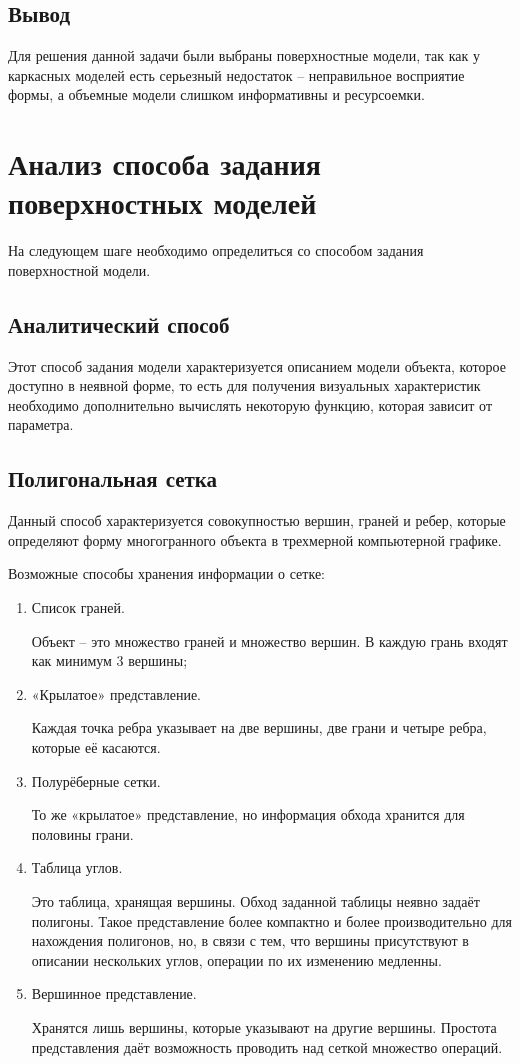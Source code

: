 \subsection*{Вывод}	
Для решения данной задачи были выбраны поверхностные модели, так как у каркасных моделей есть серьезный недостаток – неправильное восприятие формы, а объемные модели слишком информативны и ресурсоемки.

\section{Анализ способа задания поверхностных моделей}
На следующем шаге необходимо определиться со способом задания поверхностной модели.

\subsection{Аналитический способ}

 Этот способ задания модели характеризуется описанием модели объекта, которое доступно в неявной форме, то есть для получения визуальных характеристик необходимо дополнительно вычислять некоторую функцию, которая зависит от параметра.

\subsection{Полигональная сетка}

 Данный способ характеризуется совокупностью вершин, граней и ребер, которые определяют форму многогранного объекта в трехмерной компьютерной графике.

Возможные способы хранения информации о сетке:

\begin{enumerate}

\item Список граней. 

Объект – это множество граней и множество вершин. В каждую грань входят как минимум 3 вершины;
\item«Крылатое» представление. 

Каждая точка ребра указывает на две вершины, две грани и четыре ребра, которые её касаются.

\item Полурёберные сетки.

 То же «крылатое» представление, но информация обхода хранится для половины грани.
 
\item Таблица углов.

 Это таблица, хранящая вершины. Обход заданной таблицы неявно задаёт полигоны. Такое представление более компактно и более производительно для нахождения полигонов, но, в связи с тем, что вершины присутствуют в описании нескольких углов, операции по их изменению медленны.
 
\item Вершинное представление.

 Хранятся лишь вершины, которые указывают на другие вершины. Простота представления даёт возможность проводить над сеткой множество операций.

\end{enumerate}

